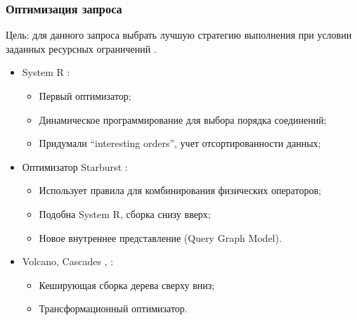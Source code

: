 \documentclass{beamer}
\begin{document}
\begin{frame}[allowframebreaks]
	\frametitle{Оптимизация запроса}
	
	\begin{block}{Цель:}
		для данного запроса выбрать лучшую стратегию выполнения при условии заданных ресурсных ограничений \cite{Neumann2009}.
	\end{block}
	
	\begin{itemize}
		\item System R \cite{Selinger1979}: 
		\begin{itemize}
			\item Первый оптимизатор;
			\item Динамическое программирование для выбора порядка соединений;
			\item Придумали ``interesting orders'', учет отсортированности данных;
		\end{itemize}
		\item Оптимизатор Starburst \cite{Haas1989}:
		\begin{itemize}
			\item Использует правила для комбинирования физических операторов;
			\item Подобна System R, сборка снизу вверх;
			\item Новое внутреннее представление (Query Graph Model).
		\end{itemize}
		\item Volcano, Cascades \cite{Graefe1993}, \cite{Graefe1995}: 
		\begin{itemize}
			\item Кеширующая сборка дерева сверху вниз;
			\item Трансформационный оптимизатор.
		\end{itemize} 
	\end{itemize}
	
\end{frame}
\end{document}
